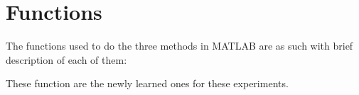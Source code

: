 \documentclass[12pt]{article}
\begin{document}




\pagebreak
\section*{Functions}
The functions used to do the three methods in MATLAB are as such with brief description of each of them:
\begin{description}
    \item[]
\end{description}
These function are the newly learned ones for these experiments.
\pagebreak


\end{document}

